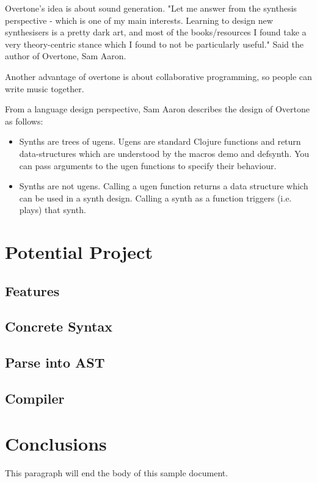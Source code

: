 Overtone's idea is about sound generation. "Let me answer from the synthesis perspective - which is one of my main interests. Learning to design new synthesisers is a pretty dark art, and most of the books/resources I found take a very theory-centric stance which I found to not be particularly useful." Said the author of Overtone, Sam Aaron.\cite{Aaron13}

Another advantage of overtone is about collaborative programming, so people can write music together.

From a language design perspective, Sam Aaron describes the design of Overtone as follows:
\begin{itemize}
\item Synths are trees of ugens. Ugens are standard Clojure functions and return data-structures which are understood by the macros demo and defsynth. You can pass arguments to the ugen functions to specify their behaviour.
\item Synths are not ugens. Calling a ugen function returns a data structure which can be used in a synth design. Calling a synth as a function triggers (i.e. plays) that synth.
\end{itemize}


\section{Potential Project}

\subsection{Features}
\subsection{Concrete Syntax}
\subsection{Parse into AST}
\subsection{Compiler}

\section{Conclusions}

This paragraph will end the body of this sample document.
